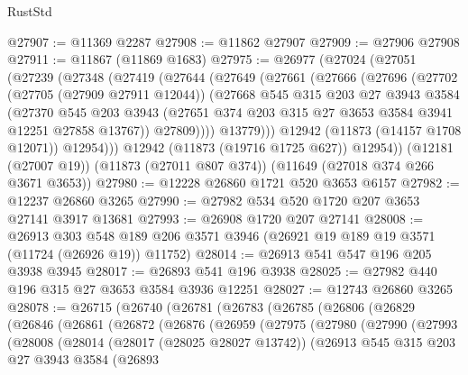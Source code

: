 \begin{lexlean}{RustStd}
\begin{coremodule}
@27907 := @11369 @2287
@27908 := @11862 @27907
@27909 := @27906 @27908
@27911 := @11867 (@11869 @1683)
@27975 := @26977
    (@27024
      (@27051
        (@27239
          (@27348
            (@27419
              (@27644
                (@27649
                  (@27661
                    (@27666
                      (@27696
                        (@27702
                          (@27705 (@27909 @27911 @12044))
                          (@27668
                            @545
                            @315
                            @203
                            @27
                            @3943
                            @3584
                            (@27370
                              @545
                              @203
                              @3943
                              (@27651 @374 @203 @315 @27 @3653 @3584 @3941 @12251 @27858 @13767))
                            @27809))))
                    @13779)))
              @12942
              (@11873 (@14157 @1708 @12071))
              @12954)))
        @12942
        (@11873 (@19716 @1725 @627))
        @12954))
    (@12181 (@27007 @19))
    (@11873 (@27011 @807 @374))
    (@11649 (@27018 @374 @266 @3671 @3653))
@27980 := @12228 @26860 @1721 @520 @3653 @6157
@27982 := @12237 @26860 @3265
@27990 := @27982 @534 @520 @1720 @207 @3653 @27141 @3917 @13681
@27993 := @26908 @1720 @207 @27141
@28008 := @26913
    @303
    @548
    @189
    @206
    @3571
    @3946
    (@26921 @19 @189 @19 @3571 (@11724 (@26926 @19)) @11752)
@28014 := @26913 @541 @547 @196 @205 @3938 @3945
@28017 := @26893 @541 @196 @3938
@28025 := @27982 @440 @196 @315 @27 @3653 @3584 @3936 @12251
@28027 := @12743 @26860 @3265
@28078 := @26715
    (@26740
      (@26781
        (@26783
          (@26785
            (@26806
              (@26829
                (@26846
                  (@26861
                    (@26872
                      (@26876
                        (@26959
                          (@27975
                            (@27980
                              (@27990
                                (@27993
                                  (@28008
                                    (@28014
                                      (@28017 (@28025 @28027 @13742))
                                      (@26913
                                        @545
                                        @315
                                        @203
                                        @27
                                        @3943
                                        @3584
                                        (@26893

\end{coremodule}
\end{lexlean}
